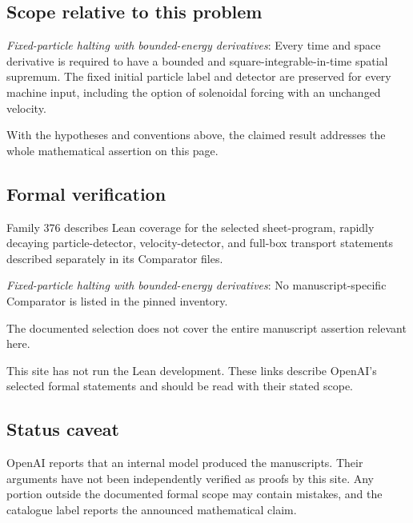 \documentclass[11pt]{article}
\begin{document}
\subsection{Scope relative to this problem}
\textit{Fixed-particle halting with bounded-energy derivatives}: Every time and space derivative is required to have a bounded and square-integrable-in-time spatial supremum. The fixed initial particle label and detector are preserved for every machine input, including the option of solenoidal forcing with an unchanged velocity.

With the hypotheses and conventions above, the claimed result addresses the whole mathematical assertion on this page.

\subsection{Formal verification}
Family 376 describes Lean coverage for the selected sheet-program, rapidly decaying particle-detector, velocity-detector, and full-box transport statements described separately in its Comparator files.

\textit{Fixed-particle halting with bounded-energy derivatives}: No manuscript-specific Comparator is listed in the pinned inventory.

The documented selection does not cover the entire manuscript assertion relevant here.

This site has not run the Lean development. These links describe OpenAI’s selected formal statements and should be read with their stated scope.

\subsection{Status caveat}
OpenAI reports that an internal model produced the manuscripts. Their arguments have not been independently verified as proofs by this site. Any portion outside the documented formal scope may contain mistakes, and the catalogue label reports the announced mathematical claim.
\end{document}
